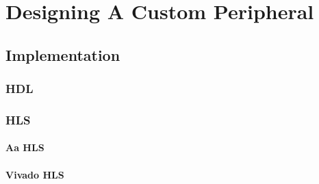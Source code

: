 \chapter{Designing A Custom Peripheral}

\section{Implementation}

\subsection{HDL}

\subsection{HLS}

\subsubsection{Aa HLS}

\subsubsection{Vivado HLS}
